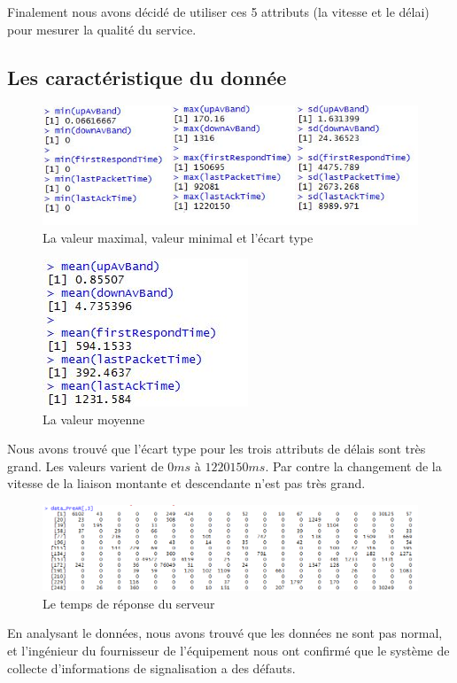 Finalement nous avons décidé de utiliser ces 5 attributs (la vitesse et le délai) pour mesurer la qualité du service.

\subsection{Les caractéristique du donnée}



\begin{figure}[H]
\centering
\includegraphics[width=0.8\linewidth, height=0.2\textheight]{images/max-min}
\caption{La valeur maximal, valeur minimal et l'écart type}
\label{fig:max-min}
\end{figure}

\begin{figure}[H]
\centering
\includegraphics[width=0.3\linewidth]{images/mean}
\caption{La valeur moyenne}
\label{fig:mean}
\end{figure}

Nous avons trouvé que l'écart type pour les trois attributs de délais sont très grand. Les valeurs varient de $0ms$ à $1220150ms$. Par contre la changement  de la vitesse de la liaison montante et descendante n'est pas très grand.

\begin{figure}[H]
\centering
\includegraphics[width=0.9\linewidth]{images/data-delai}
\caption{Le temps de réponse du serveur}
\label{fig:data-delai}
\end{figure}
En analysant le données, nous avons trouvé que les données ne sont pas normal, et l'ingénieur du fournisseur de l'équipement nous ont confirmé que le système de collecte d'informations de signalisation a des défauts. 
 
